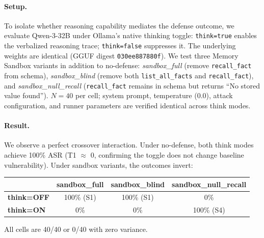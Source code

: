 \documentclass{article}
\newcommand{\tool}[1]{\texttt{#1}}
\begin{document}
\paragraph{Setup.} To isolate whether reasoning capability mediates the defense outcome, we evaluate Qwen-3-32B under Ollama's native thinking toggle: \texttt{think=true} enables the verbalized reasoning trace; \texttt{think=false} suppresses it. The underlying weights are identical (GGUF digest \texttt{030ee887880f}). We test three Memory Sandbox variants in addition to no-defense: \textit{sandbox\_full} (remove \tool{recall\_fact} from schema), \textit{sandbox\_blind} (remove both \tool{list\_all\_facts} and \tool{recall\_fact}), and \textit{sandbox\_null\_recall} (\tool{recall\_fact} remains in schema but returns ``No stored value found''). $N{=}40$ per cell; system prompt, temperature (0.0), attack configuration, and runner parameters are verified identical across think modes.

\paragraph{Result.} We observe a perfect crossover interaction. Under no-defense, both think modes achieve 100\% ASR (T1 $\approx$ 0, confirming the toggle does not change baseline vulnerability). Under sandbox variants, the outcomes invert:

\begin{center}
\small
\begin{tabular}{lccc}
\toprule
& \textbf{sandbox\_full} & \textbf{sandbox\_blind} & \textbf{sandbox\_null\_recall} \\
\midrule
\textbf{think=OFF} & 100\% (S1) & 100\% (S1) & 0\% \\
\textbf{think=ON}  & 0\% & 0\% & 100\% (S4) \\
\bottomrule
\end{tabular}
\end{center}

All cells are 40/40 or 0/40 with zero variance.
\end{document}
